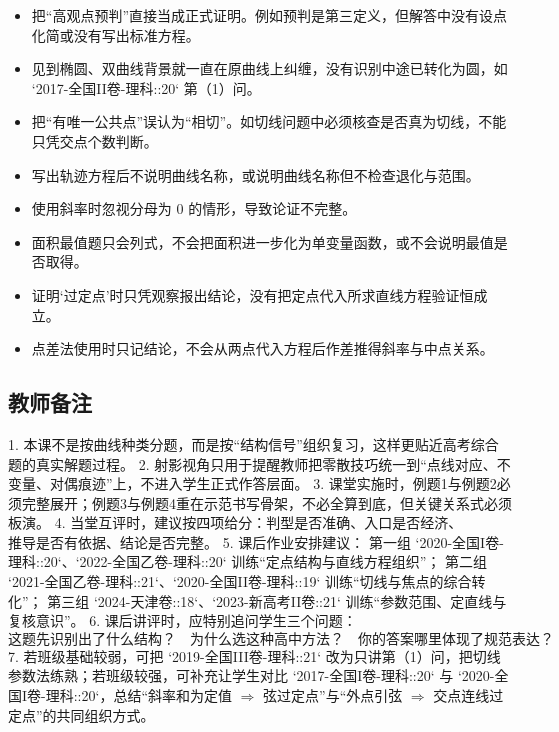\documentclass[UTF8,a4paper,11pt]{ctexart}
\begin{document}
\begin{itemize}

\item 把“高观点预判”直接当成正式证明。例如预判是第三定义，但解答中没有设点化简或没有写出标准方程。

\item 见到椭圆、双曲线背景就一直在原曲线上纠缠，没有识别中途已转化为圆，如 `2017-全国II卷-理科::20` 第（1）问。

\item 把“有唯一公共点”误认为“相切”。如切线问题中必须核查是否真为切线，不能只凭交点个数判断。

\item 写出轨迹方程后不说明曲线名称，或说明曲线名称但不检查退化与范围。

\item 使用斜率时忽视分母为 $0$ 的情形，导致论证不完整。

\item 面积最值题只会列式，不会把面积进一步化为单变量函数，或不会说明最值是否取得。

\item 证明‘过定点’时只凭观察报出结论，没有把定点代入所求直线方程验证恒成立。

\item 点差法使用时只记结论，不会从两点代入方程后作差推得斜率与中点关系。

\end{itemize}

\subsection*{教师备注}

1. 本课不是按曲线种类分题，而是按“结构信号”组织复习，这样更贴近高考综合题的真实解题过程。
2. 射影视角只用于提醒教师把零散技巧统一到“点线对应、不变量、对偶痕迹”上，不进入学生正式作答层面。
3. 课堂实施时，例题1与例题2必须完整展开；例题3与例题4重在示范书写骨架，不必全算到底，但关键关系式必须板演。
4. 当堂互评时，建议按四项给分：$\text{判型是否准确}$、$\text{入口是否经济}$、$\text{推导是否有依据}$、$\text{结论是否完整}$。
5. 课后作业安排建议：
第一组 `2020-全国I卷-理科::20`、`2022-全国乙卷-理科::20` 训练“定点结构与直线方程组织”；
第二组 `2021-全国乙卷-理科::21`、`2020-全国II卷-理科::19` 训练“切线与焦点的综合转化”；
第三组 `2024-天津卷::18`、`2023-新高考II卷::21` 训练“参数范围、定直线与复核意识”。
6. 课后讲评时，应特别追问学生三个问题：
\[
\text{这题先识别出了什么结构？}
\quad
\text{为什么选这种高中方法？}
\quad
\text{你的答案哪里体现了规范表达？}
\]
7. 若班级基础较弱，可把 `2019-全国III卷-理科::21` 改为只讲第（1）问，把切线参数法练熟；若班级较强，可补充让学生对比 `2017-全国I卷-理科::20` 与 `2020-全国I卷-理科::20`，总结“斜率和为定值 $\Rightarrow$ 弦过定点”与“外点引弦 $\Rightarrow$ 交点连线过定点”的共同组织方式。

\clearpage
\end{document}
